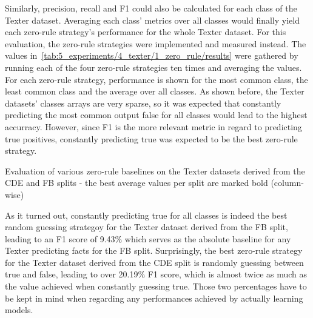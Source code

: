 Similarly, precision, recall and F1 could also be calculated for each class of the Texter dataset. Averaging each class' metrics over all classes would finally yield each zero-rule strategy's performance for the whole Texter dataset. For this evaluation, the zero-rule strategies were implemented and measured instead. The values in~\ref{tab:5_experiments/4_texter/1_zero_rule/results} were gathered by running each of the four zero-rule strategies ten times and averaging the values. For each zero-rule strategy, performance is shown for the most common class, the least common class and the average over all classes. As shown before, the Texter datasets' classes arrays are very sparse, so it was expected that constantly predicting the most common output false for all classes would lead to the highest accurracy. However, since F1 is the more relevant metric in regard to predicting true positives, constantly predicting true was expected to be the best zero-rule strategy.

\begin{table}[h]
    \makebox[\textwidth][c]{
        
    }
    \caption{Evaluation of various zero-rule baselines on the Texter datasets derived from the CDE and FB splits - the best average values per split are marked bold (column-wise)}
    \label{tab:5_experiments/4_texter/1_zero_rule/results}
\end{table}

As it turned out, constantly predicting true for all classes is indeed the best random guessing strategoy for the Texter dataset derived from the FB split, leading to an F1 score of 9.43\% which serves as the absolute baseline for any Texter predicting facts for the FB split. Surprisingly, the best zero-rule strategy for the Texter dataset derived from the CDE split is randomly guessing between true and false, leading to over 20.19\% F1 score, which is almost twice as much as the value achieved when constantly guessing true. Those two percentages have to be kept in mind when regarding any performances achieved by actually learning models.
